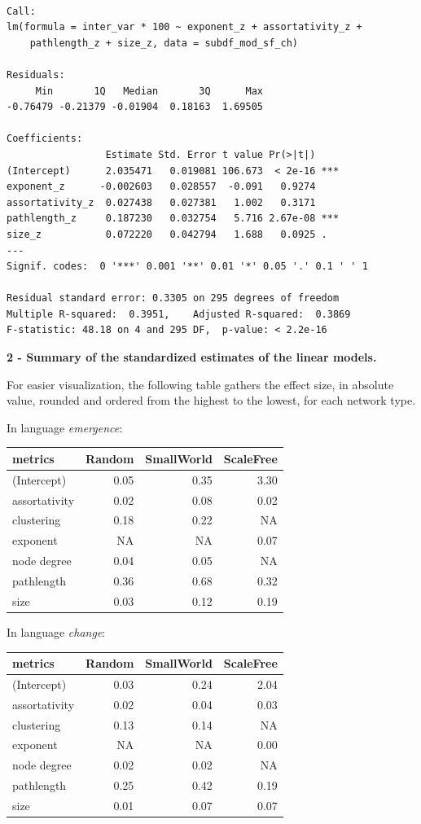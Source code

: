 \documentclass[
]{article}
\begin{document}
\begin{verbatim}

Call:
lm(formula = inter_var * 100 ~ exponent_z + assortativity_z + 
    pathlength_z + size_z, data = subdf_mod_sf_ch)

Residuals:
     Min       1Q   Median       3Q      Max 
-0.76479 -0.21379 -0.01904  0.18163  1.69505 

Coefficients:
                 Estimate Std. Error t value Pr(>|t|)    
(Intercept)      2.035471   0.019081 106.673  < 2e-16 ***
exponent_z      -0.002603   0.028557  -0.091   0.9274    
assortativity_z  0.027438   0.027381   1.002   0.3171    
pathlength_z     0.187230   0.032754   5.716 2.67e-08 ***
size_z           0.072220   0.042794   1.688   0.0925 .  
---
Signif. codes:  0 '***' 0.001 '**' 0.01 '*' 0.05 '.' 0.1 ' ' 1

Residual standard error: 0.3305 on 295 degrees of freedom
Multiple R-squared:  0.3951,    Adjusted R-squared:  0.3869 
F-statistic: 48.18 on 4 and 295 DF,  p-value: < 2.2e-16
\end{verbatim}

\textbf{2 - Summary of the standardized estimates of the linear models.}

For easier visualization, the following table gathers the effect size,
in absolute value, rounded and ordered from the highest to the lowest,
for each network type.

In language \emph{emergence}:

\begin{longtable}[]{@{}lrrr@{}}
\toprule()
metrics & Random & SmallWorld & ScaleFree \\
\midrule()
\endhead
(Intercept) & 0.05 & 0.35 & 3.30 \\
assortativity & 0.02 & 0.08 & 0.02 \\
clustering & 0.18 & 0.22 & NA \\
exponent & NA & NA & 0.07 \\
node degree & 0.04 & 0.05 & NA \\
pathlength & 0.36 & 0.68 & 0.32 \\
size & 0.03 & 0.12 & 0.19 \\
\bottomrule()
\end{longtable}

In language \emph{change}:

\begin{longtable}[]{@{}lrrr@{}}
\toprule()
metrics & Random & SmallWorld & ScaleFree \\
\midrule()
\endhead
(Intercept) & 0.03 & 0.24 & 2.04 \\
assortativity & 0.02 & 0.04 & 0.03 \\
clustering & 0.13 & 0.14 & NA \\
exponent & NA & NA & 0.00 \\
node degree & 0.02 & 0.02 & NA \\
pathlength & 0.25 & 0.42 & 0.19 \\
size & 0.01 & 0.07 & 0.07 \\
\bottomrule()
\end{longtable}
\end{document}
